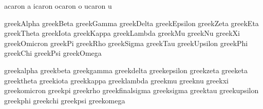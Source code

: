 \stopencoding


\startencoding[default]

 acaron {\buildtextaccent\textcaron a}         %
 icaron {\buildtextaccent\textcaron \dotlessi} %
 ocaron {\buildtextaccent\textcaron o}         %
 ucaron {\buildtextaccent\textcaron u}         %

\stopencoding


\startencoding[default]


 greekAlpha   {\Alpha}
 greekBeta    {\Beta}
 greekGamma   {\Gamma}
 greekDelta   {\Delta}
 greekEpsilon {\Epsilon}
 greekZeta    {\Zeta}
 greekEta     {\Eta}
 greekTheta   {\Theta}
 greekIota    {\Iota}
 greekKappa   {\Kappa}
 greekLambda  {\Lambda}
 greekMu      {\Mu}
 greekNu      {\Nu}
 greekXi      {\Xi}
 greekOmicron {\Omicron}
 greekPi      {\Pi}
 greekRho     {\Rho}
 greekSigma   {\Sigma}
 greekTau     {\Tau}
 greekUpsilon {\Upsilon}
 greekPhi     {\Phi}
 greekChi     {\Chi}
 greekPsi     {\Psi}
 greekOmega   {\Omega}


 greekalpha      {\alpha}
 greekbeta       {\beta}
 greekgamma      {\gamma}
 greekdelta      {\delta}
 greekepsilon    {\epsilon}
 greekzeta       {\zeta}
 greeketa        {\eta}
 greektheta      {\theta}
 greekiota       {\iota}
 greekkappa      {\kappa}
 greeklambda     {\lambda}
 greekmu         {\mu}
 greeknu         {\nu}
 greekxi         {\xi}
 greekomicron    {\omicron}
 greekpi         {\pi}
 greekrho        {\rho}
 greekfinalsigma {\sigma}
 greeksigma      {\sigma}
 greektau        {\tau}
 greekupsilon    {\upsilon}
 greekphi        {\phi}
 greekchi        {\chi}
 greekpsi        {\psi}
 greekomega      {\omega}

